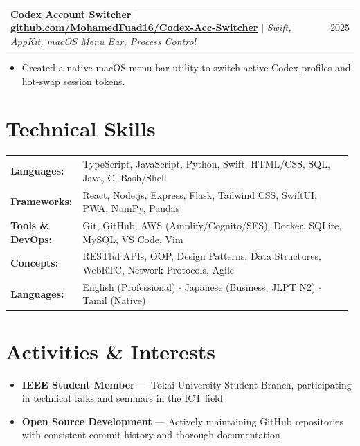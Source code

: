 \documentclass[10pt, a4paper]{article}
\makeatletter
\newcommand{\cvproject}[3]{%
  \vspace{1.5pt}
  \begin{tabularx}{\linewidth}{@{}Xr@{}}
    \textbf{\color{darkgray}#1} \textcolor{medgray}{\small $|$ \textit{#2}} & \textcolor{medgray}{\small #3}\\
  \end{tabularx}
  \vspace{-1.5pt}
}
\newenvironment{cvbullets}{%
  \begin{itemize}[leftmargin=1em, itemsep=0.2pt, topsep=0.5pt, parsep=0pt]
  \small\color{darkgray}
}{%
  \end{itemize}\vspace{1pt}
}
\newcommand{\skillrow}[2]{%
  \textbf{\color{darkgray}\small #1:} & \small #2 \\[2pt]
}
\makeatother
\begin{document}
\cvproject{Codex Account Switcher $|$ \small\color{medgray}\href{https://github.com/MohamedFuad16/Codex-Acc-Switcher}{github.com/MohamedFuad16/Codex-Acc-Switcher}}{Swift, AppKit, macOS Menu Bar, Process Control}{2025}
\begin{cvbullets}
  \item Created a native macOS menu-bar utility to switch active Codex profiles and hot-swap session tokens.
\end{cvbullets}

\section{Technical Skills}
\begin{tabular}{@{}p{0.20\linewidth}p{0.78\linewidth}@{}}
  \skillrow{Languages}{TypeScript, JavaScript, Python, Swift, HTML/CSS, SQL, Java, C, Bash/Shell}
  \skillrow{Frameworks}{React, Node.js, Express, Flask, Tailwind CSS, SwiftUI, PWA, NumPy, Pandas}
  \skillrow{Tools \& DevOps}{Git, GitHub, AWS (Amplify/Cognito/SES), Docker, SQLite, MySQL, VS Code, Vim}
  \skillrow{Concepts}{RESTful APIs, OOP, Design Patterns, Data Structures, WebRTC, Network Protocols, Agile}
  \skillrow{Languages}{English (Professional) $\cdot$ Japanese (Business, JLPT N2) $\cdot$ Tamil (Native)}
\end{tabular}

\section{Activities \& Interests}
\begin{itemize}[leftmargin=1em, itemsep=1pt, topsep=1pt]
  \item\small \textbf{IEEE Student Member} --- Tokai University Student Branch, participating in technical talks and seminars in the ICT field
  \item\small \textbf{Open Source Development} --- Actively maintaining GitHub repositories with consistent commit history and thorough documentation
\end{itemize}
\end{document}
